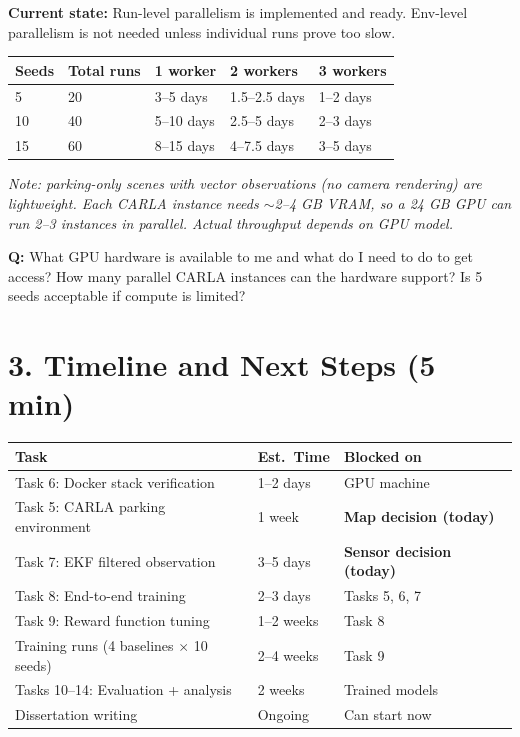 \documentclass[11pt,a4paper]{article}
\newcommand{\question}[1]{\textcolor{question}{\textbf{Q:}} #1}
\begin{document}
\textbf{Current state:} Run-level parallelism is implemented and ready. Env-level parallelism is not needed unless individual runs prove too slow.

\begin{table}[h]
\centering
\small
\begin{tabular}{@{}lllll@{}}
\toprule
\textbf{Seeds} & \textbf{Total runs} & \textbf{1 worker} & \textbf{2 workers} & \textbf{3 workers} \\
\midrule
5 & 20 & 3--5 days & 1.5--2.5 days & 1--2 days \\
10 & 40 & 5--10 days & 2.5--5 days & 2--3 days \\
15 & 60 & 8--15 days & 4--7.5 days & 3--5 days \\
\bottomrule
\end{tabular}
\end{table}

\textit{Note: parking-only scenes with vector observations (no camera rendering) are lightweight. Each CARLA instance needs $\sim$2--4 GB VRAM, so a 24 GB GPU can run 2--3 instances in parallel. Actual throughput depends on GPU model.}

\question{What GPU hardware is available to me and what do I need to do to get access? How many parallel CARLA instances can the hardware support? Is 5 seeds acceptable if compute is limited?}

\section*{3. Timeline and Next Steps (5 min)}

\begin{table}[h]
\centering
\small
\begin{tabular}{@{}lll@{}}
\toprule
\textbf{Task} & \textbf{Est.\ Time} & \textbf{Blocked on} \\
\midrule
Task 6: Docker stack verification & 1--2 days & GPU machine \\
Task 5: CARLA parking environment & 1 week & \textbf{Map decision (today)} \\
Task 7: EKF filtered observation & 3--5 days & \textbf{Sensor decision (today)} \\
Task 8: End-to-end training & 2--3 days & Tasks 5, 6, 7 \\
Task 9: Reward function tuning & 1--2 weeks & Task 8 \\
Training runs (4 baselines $\times$ 10 seeds) & 2--4 weeks & Task 9 \\
Tasks 10--14: Evaluation + analysis & 2 weeks & Trained models \\
Dissertation writing & Ongoing & Can start now \\
\bottomrule
\end{tabular}
\end{table}
\end{document}
